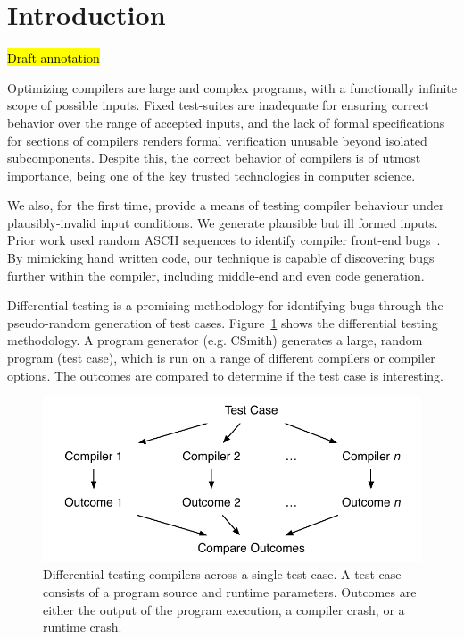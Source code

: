 \section{Introduction}\label{sec:intro}

\hl{Draft annotation}

\noindent
Optimizing compilers are large and complex programs, with a functionally infinite scope of possible inputs. Fixed test-suites are inadequate for ensuring correct behavior over the range of accepted inputs, and the lack of formal specifications for sections of compilers renders formal verification unusable beyond isolated subcomponents. Despite this, the correct behavior of compilers is of utmost importance, being one of the key trusted technologies in computer science.

 We also, for the first time, provide a means of testing compiler behaviour under plausibly-invalid input conditions. We generate plausible but ill formed inputs. Prior work used random ASCII sequences to identify compiler front-end bugs~\cite{McKeeman1998}. By mimicking hand written code, our technique is capable of discovering bugs further within the compiler, including middle-end and even code generation.

Differential testing is a promising methodology for identifying bugs through the pseudo-random generation of test cases. Figure~\ref{fig:difftest} shows the differential testing methodology. A program generator (e.g. CSmith) generates a large, random program (test case), which is run on a range of different compilers or compiler options. The outcomes are compared to determine if the test case is interesting.

\begin{figure}
	\centering
	\includegraphics[width=.9\columnwidth]{img/difftest} %
	\caption{%
		Differential testing compilers across a single test case. A test case consists of a program source and runtime parameters. Outcomes are either the output of the program execution, a compiler crash, or a runtime crash.%
	}%
	\label{fig:difftest}
\end{figure}

